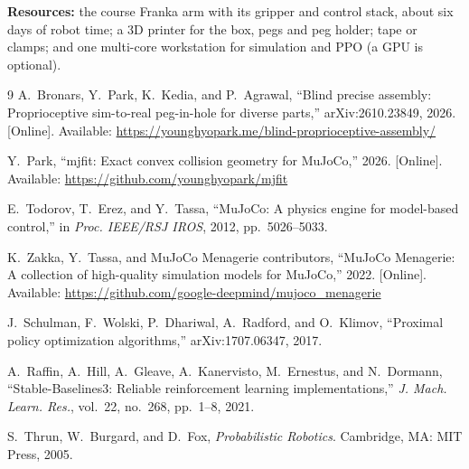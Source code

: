 \documentclass[conference]{IEEEtran}
\begin{document}
\textbf{Resources:} the course Franka arm with its gripper and control stack,
about six days of robot time; a 3D printer for the box, pegs and peg holder;
tape or clamps; and one multi-core workstation for simulation and PPO (a GPU is
optional).

\begin{thebibliography}{9}
A.~Bronars, Y.~Park, K.~Kedia, and P.~Agrawal, ``Blind precise assembly:
Proprioceptive sim-to-real peg-in-hole for diverse parts,'' arXiv:2610.23849,
2026. [Online]. Available: \url{https://younghyopark.me/blind-proprioceptive-assembly/}

Y.~Park, ``mjfit: Exact convex collision geometry for MuJoCo,'' 2026.
[Online]. Available: \url{https://github.com/younghyopark/mjfit}

E.~Todorov, T.~Erez, and Y.~Tassa, ``MuJoCo: A physics engine for model-based
control,'' in \emph{Proc. IEEE/RSJ IROS}, 2012, pp.~5026--5033.

K.~Zakka, Y.~Tassa, and MuJoCo Menagerie contributors, ``MuJoCo Menagerie: A
collection of high-quality simulation models for MuJoCo,'' 2022. [Online].
Available: \url{https://github.com/google-deepmind/mujoco_menagerie}

J.~Schulman, F.~Wolski, P.~Dhariwal, A.~Radford, and O.~Klimov, ``Proximal
policy optimization algorithms,'' arXiv:1707.06347, 2017.

A.~Raffin, A.~Hill, A.~Gleave, A.~Kanervisto, M.~Ernestus, and N.~Dormann,
``Stable-Baselines3: Reliable reinforcement learning implementations,''
\emph{J. Mach. Learn. Res.}, vol.~22, no.~268, pp.~1--8, 2021.

S.~Thrun, W.~Burgard, and D.~Fox, \emph{Probabilistic Robotics}. Cambridge, MA:
MIT Press, 2005.
\end{thebibliography}
\end{document}
